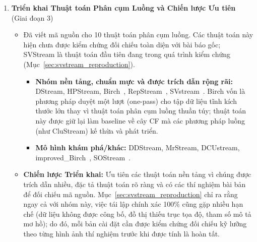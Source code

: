 \begin{enumerate}[label=\textbf{C\arabic*.},leftmargin=2.2em]
  \item \textbf{Triển khai Thuật toán Phân cụm Luồng và Chiến lược Ưu tiên} \hfill{\small(Giai đoạn 3)}\\
  \begin{itemize}[leftmargin=1.2em,itemsep=2pt,topsep=1pt]
    \item Đã viết mã nguồn cho 10 thuật toán phân cụm luồng. Các thuật toán này hiện chưa được kiểm chứng đối chiếu toàn diện với bài báo gốc; SVStream là thuật toán đầu tiên đang trong quá trình kiểm chứng (Mục~\ref{sec:svstream_reproduction}).
    \begin{itemize}[leftmargin=1.2em,itemsep=1pt]
      \item \textbf{Nhóm nền tảng, chuẩn mực và được trích dẫn rộng rãi:} DStream, HPStream, Birch~\cite{zhang1996birch}, RepStream~\cite{luhr2009repstream}, SVstream~\cite{wang2013svstream}. Birch vốn là phương pháp duyệt một lượt (one-pass) cho tập dữ liệu tĩnh kích thước lớn thay vì thuật toán phân cụm luồng thuần túy; thuật toán này được giữ lại làm baseline về cây CF mà các phương pháp luồng (như CluStream) kế thừa và phát triển.
      \item \textbf{Mô hình khám phá/khác:} DDStream, MrStream, DCUstream, improved\_Birch~\cite{ismael2014improvedbirch}, SOStream~\cite{isaksson2012sostream}.
    \end{itemize}
    \item \textbf{Chiến lược Triển khai:} Ưu tiên các thuật toán nền tảng vì chúng được trích dẫn nhiều, đặc tả thuật toán rõ ràng và có các thí nghiệm bài bản để đối chiếu mã nguồn. Mục~\ref{sec:svstream_reproduction} chỉ ra rằng ngay cả với nhóm này, việc tái lập chính xác 100\% cũng gặp nhiều hạn chế (dữ liệu không được công bố, đồ thị thiếu trục tọa độ, tham số mô tả mơ hồ); do đó, mỗi bản cài đặt cần được kiểm chứng đối chiếu kỹ lưỡng theo từng hình ảnh thí nghiệm trước khi được tính là hoàn tất.
  \end{itemize}


\end{enumerate}
